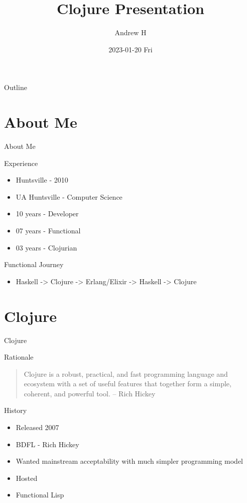 \documentclass[bigger]{beamer}
\author{Andrew H}
\date{2023-01-20 Fri}
\title{Clojure Presentation}
\begin{document}
\maketitle
\begin{frame}{Outline}
\tableofcontents
\end{frame}


\section{About Me}
\label{sec:org0d5cedf}
\begin{frame}[label={sec:orgfec7406}]{About Me}
\begin{block}{Experience}
\begin{itemize}
\item Huntsville - 2010
\item UA Huntsville - Computer Science
\item 10 years - Developer
\item 07 years - Functional
\item 03 years - Clojurian
\end{itemize}
\end{block}

\begin{block}{Functional Journey}
\begin{itemize}
\item Haskell -> Clojure -> Erlang/Elixir -> Haskell -> Clojure
\end{itemize}
\end{block}
\end{frame}
\section{Clojure}
\label{sec:orgf1bad2c}
\begin{frame}[label={sec:org685648d}]{Clojure}
\begin{block}{Rationale}
\begin{quote}
Clojure is a robust, practical, and fast programming language and ecosystem with
a set of useful features that together form a simple, coherent, and powerful tool. -- Rich Hickey
\end{quote}
\end{block}
\end{frame}

\begin{frame}[label={sec:org952dc11}]{History}
\begin{itemize}
\item Released 2007
\item BDFL - Rich Hickey
\item Wanted mainstream acceptability with much simpler programming model
\item Hosted
\item Functional Lisp
\end{itemize}
\end{frame}
\end{document}
